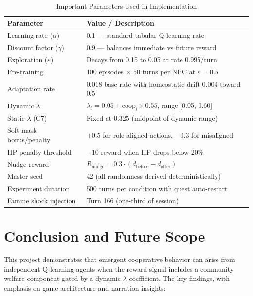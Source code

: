 \documentclass[12pt, a4paper, oneside]{report}
\begin{document}
\begin{table}[H]
\centering
\caption{Important Parameters Used in Implementation}
\label{tab:parameters}
\begin{tabularx}{\textwidth}{|l|X|}
\hline
\textbf{Parameter} & \textbf{Value / Description} \\
\hline
Learning rate ($\alpha$) & 0.1 --- standard tabular Q-learning rate \\
\hline
Discount factor ($\gamma$) & 0.9 --- balances immediate vs future reward \\
\hline
Exploration ($\varepsilon$) & Decays from 0.15 to 0.05 at rate 0.995/turn \\
\hline
Pre-training & 100 episodes $\times$ 50 turns per NPC at $\varepsilon = 0.5$ \\
\hline
Adaptation rate & 0.018 base rate with homeostatic drift 0.004 toward 0.5 \\
\hline
Dynamic $\lambda$ & $\lambda_i = 0.05 + \text{coop}_i \times 0.55$, range [0.05, 0.60] \\
\hline
Static $\lambda$ (C7) & Fixed at 0.325 (midpoint of dynamic range) \\
\hline
Soft mask bonus/penalty & $+0.5$ for role-aligned actions, $-0.3$ for misaligned \\
\hline
HP penalty threshold & $-10$ reward when HP drops below 20\% \\
\hline
Nudge reward & $R_{\text{nudge}} = 0.3 \cdot (d_{\text{before}} - d_{\text{after}})$ \\
\hline
Master seed & 42 (all randomness derived deterministically) \\
\hline
Experiment duration & 500 turns per condition with quest auto-restart \\
\hline
Famine shock injection & Turn 166 (one-third of session) \\
\hline
\end{tabularx}
\end{table}

\chapter{Conclusion and Future Scope}
\label{chap:conclusion}

This project demonstrates that emergent cooperative behavior can arise from independent Q-learning agents when the reward signal includes a community welfare component gated by a dynamic $\lambda$ coefficient. The key findings, with emphasis on game architecture and narration insights:
\end{document}
